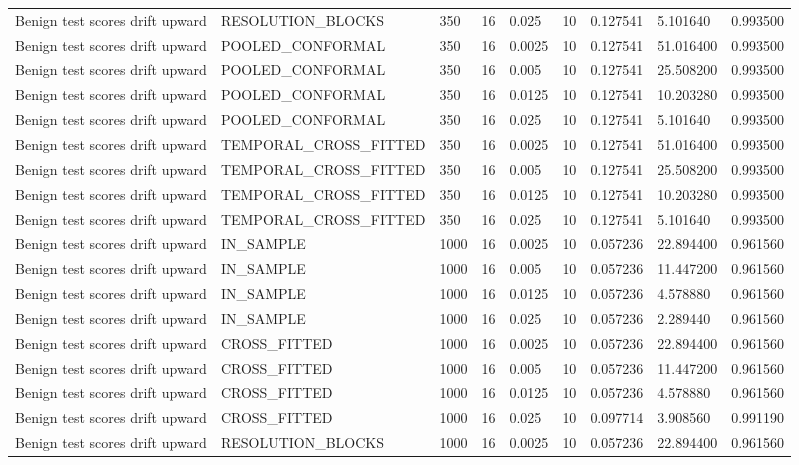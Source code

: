 \begin{tabular}{lllllllll}
Benign test scores drift upward & RESOLUTION\_BLOCKS & 350 & 16 & 0.025 & 10 & 0.127541 & 5.101640 & 0.993500 \\
Benign test scores drift upward & POOLED\_CONFORMAL & 350 & 16 & 0.0025 & 10 & 0.127541 & 51.016400 & 0.993500 \\
Benign test scores drift upward & POOLED\_CONFORMAL & 350 & 16 & 0.005 & 10 & 0.127541 & 25.508200 & 0.993500 \\
Benign test scores drift upward & POOLED\_CONFORMAL & 350 & 16 & 0.0125 & 10 & 0.127541 & 10.203280 & 0.993500 \\
Benign test scores drift upward & POOLED\_CONFORMAL & 350 & 16 & 0.025 & 10 & 0.127541 & 5.101640 & 0.993500 \\
Benign test scores drift upward & TEMPORAL\_CROSS\_FITTED & 350 & 16 & 0.0025 & 10 & 0.127541 & 51.016400 & 0.993500 \\
Benign test scores drift upward & TEMPORAL\_CROSS\_FITTED & 350 & 16 & 0.005 & 10 & 0.127541 & 25.508200 & 0.993500 \\
Benign test scores drift upward & TEMPORAL\_CROSS\_FITTED & 350 & 16 & 0.0125 & 10 & 0.127541 & 10.203280 & 0.993500 \\
Benign test scores drift upward & TEMPORAL\_CROSS\_FITTED & 350 & 16 & 0.025 & 10 & 0.127541 & 5.101640 & 0.993500 \\
Benign test scores drift upward & IN\_SAMPLE & 1000 & 16 & 0.0025 & 10 & 0.057236 & 22.894400 & 0.961560 \\
Benign test scores drift upward & IN\_SAMPLE & 1000 & 16 & 0.005 & 10 & 0.057236 & 11.447200 & 0.961560 \\
Benign test scores drift upward & IN\_SAMPLE & 1000 & 16 & 0.0125 & 10 & 0.057236 & 4.578880 & 0.961560 \\
Benign test scores drift upward & IN\_SAMPLE & 1000 & 16 & 0.025 & 10 & 0.057236 & 2.289440 & 0.961560 \\
Benign test scores drift upward & CROSS\_FITTED & 1000 & 16 & 0.0025 & 10 & 0.057236 & 22.894400 & 0.961560 \\
Benign test scores drift upward & CROSS\_FITTED & 1000 & 16 & 0.005 & 10 & 0.057236 & 11.447200 & 0.961560 \\
Benign test scores drift upward & CROSS\_FITTED & 1000 & 16 & 0.0125 & 10 & 0.057236 & 4.578880 & 0.961560 \\
Benign test scores drift upward & CROSS\_FITTED & 1000 & 16 & 0.025 & 10 & 0.097714 & 3.908560 & 0.991190 \\
Benign test scores drift upward & RESOLUTION\_BLOCKS & 1000 & 16 & 0.0025 & 10 & 0.057236 & 22.894400 & 0.961560 \\

\end{tabular}
